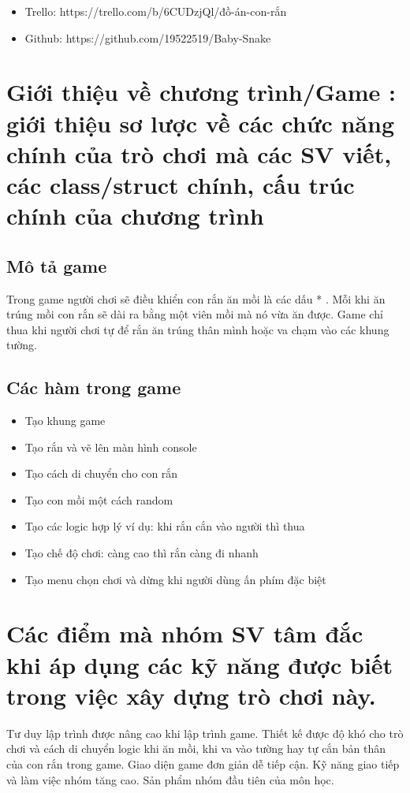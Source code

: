 \documentclass[a4paper,12pt]{article}
\begin{document}
\begin{itemize}
     \item Trello: https://trello.com/b/6CUDzjQl/đồ-án-con-rắn
     
      \item Github: https://github.com/19522519/Baby-Snake 
\end{itemize} 

\section{Giới thiệu về chương trình/Game : giới thiệu sơ lược về các chức năng chính của trò chơi mà các SV viết, các class/struct chính, cấu trúc chính của chương trình}

\subsection{Mô tả game}
Trong game người chơi sẽ điều khiển con rắn ăn mồi là các dấu * . Mỗi khi ăn trúng mồi con rắn sẽ dài ra bằng một viên mồi mà nó vừa ăn được. Game chỉ thua khi người chơi tự để rắn ăn trúng thân mình hoặc va chạm vào các khung tường.

\subsection{Các hàm trong game}
\begin{itemize}
    \item Tạo khung game
    \item Tạo rắn và vẽ lên màn hình console
    \item Tạo cách di chuyển cho con rắn 
    \item Tạo con mồi một cách random
    \item Tạo các logic hợp lý ví dụ: khi rắn cắn vào người thì thua
    \item Tạo chế độ chơi: càng cao thì rắn càng đi nhanh
    \item Tạo menu chọn chơi và dừng khi người dùng ấn phím đặc biệt
\end{itemize}


\section{ Các điểm mà nhóm SV tâm đắc khi áp dụng các kỹ năng được biết trong việc
xây dựng trò chơi này.}
Tư duy lập trình được nâng cao khi lập trình game.
Thiết kế được độ khó cho trò chơi và cách di chuyển logic khi  ăn mồi, khi va  vào tường hay tự cắn bản thân của con rắn trong game.
Giao diện game đơn giản dễ tiếp cận.
Kỹ năng giao tiếp và làm việc nhóm tăng cao.
Sản phẩm nhóm đầu tiên của môn học.
  
\end{document}
